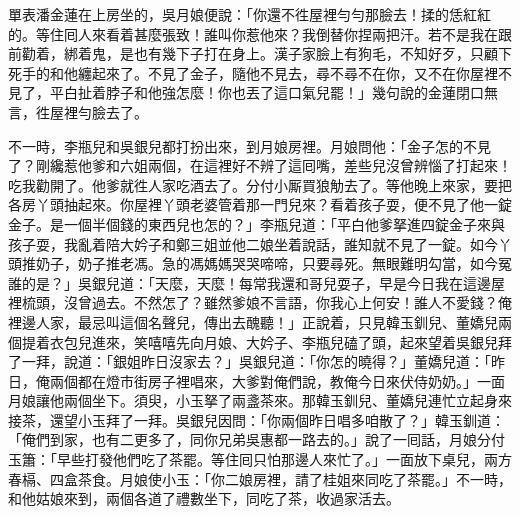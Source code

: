 單表潘金蓮在上房坐的，吳月娘便說：「你還不徃屋裡勻勻那臉去！揉的恁紅紅的。等住囘人來看着甚麼張致！誰叫你惹他來？我倒替你捏兩把汗。若不是我在跟前勸着，綁着鬼，是也有幾下子打在身上。漢子家臉上有狗毛，不知好歹，{}只顧下死手的和他纏起來了。不見了金子，隨他不見去，尋不尋不在你，又不在你屋裡不見了，平白扯着脖子和他強怎麼！你也丟了這口氣兒罷！」{}幾句說的金蓮閉口無言，徃屋裡勻臉去了。

不一時，李瓶兒和吳銀兒都打扮出來，到月娘房裡。月娘問他：「金子怎的不見了？剛纔惹他爹和六姐兩個，在這裡好不辨了這囘嘴，差些兒沒曾辨惱了打起來！吃我勸開了。他爹就徃人家吃酒去了。分付小厮買狼觔去了。等他晚上來家，要把各房丫頭抽起來。你屋裡丫頭老婆管着那一門兒來？看着孩子耍，便不見了他一錠金子。是一個半個錢的東西兒也怎的？」李瓶兒道：「平白他爹拏進四錠金子來與孩子耍，我亂着陪大妗子和鄭三姐並他二娘坐着說話，誰知就不見了一錠。如今丫頭推奶子，奶子推老馮。急的馮媽媽哭哭啼啼，只要尋死。無眼難明勾當，如今冤誰的是？」{}吳銀兒道：「天麼，天麼！每常我還和哥兒耍子，早是今日我在這邊屋裡梳頭，沒曾過去。不然怎了？雖然爹娘不言語，你我心上何安！誰人不愛錢？俺裡邊人家，最忌叫這個名聲兒，傳出去醜聽！」正說着，只見韓玉釧兒、董嬌兒兩個提着衣包兒進來，笑嘻嘻先向月娘、大妗子、李瓶兒磕了頭，起來望着吳銀兒拜了一拜，說道：「銀姐昨日沒家去？」吳銀兒道：「你怎的曉得？」董嬌兒道：「昨日，俺兩個都在燈市街房子裡唱來，大爹對俺們說，教俺今日來伏侍奶奶。」一面月娘讓他兩個坐下。須臾，小玉拏了兩盞茶來。那韓玉釧兒、董嬌兒連忙立起身來接茶，還望小玉拜了一拜。吳銀兒因問：「你兩個昨日唱多咱散了？」韓玉釧道：「俺們到家，也有二更多了，同你兄弟吳惠都一路去的。」說了一囘話，月娘分付玉簫：「早些打發他們吃了茶罷。等住囘只怕那邊人來忙了。」一面放下桌兒，兩方春槅、四盒茶食。月娘使小玉：「你二娘房裡，請了桂姐來同吃了茶罷。」不一時，和他姑娘來到，兩個各道了禮數坐下，同吃了茶，收過家活去。

